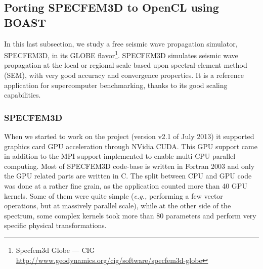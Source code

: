 \documentclass{IEEEtran}
\newcommand{\latin}[1]{\textit{#1}}
\newcommand{\eg}{\latin{e.g.,}\xspace}
\begin{document}
% 
% 
% 
% 
 


  \subsection{Porting SPECFEM3D to OpenCL using BOAST}
  \label{subsec:specfem}

In this last subsection, we study a free seismic wave propagation simulator,
SPECFEM3D, in its GLOBE flavor\footnote{Specfem3d Globe --- CIG
\url{http://www.geodynamics.org/cig/software/specfem3d-globe}}. SPECFEM3D
simulates seismic wave propagation at the local or regional scale based upon
spectral-element method (SEM), with very good accuracy and convergence
properties. It is a reference application for supercomputer benchmarking,
thanks to its good scaling capabilities.

    \subsubsection{SPECFEM3D}

When we started to work on the project (version v2.1 of July 2013) it
supported graphics card GPU acceleration through NVidia CUDA. This
GPU support came in addition to the MPI support implemented to enable
multi-CPU parallel computing. Most of SPECFEM3D code-base is written in
Fortran 2003 and only the GPU related parts are written in
C.  The split between CPU and GPU code was done at a rather fine
grain, as the application counted more than 40 GPU kernels. Some of
them were quite simple (\eg performing a few vector operations, but at
massively parallel scale), while at the other side of the spectrum,
some complex kernels took more than 80 parameters and perform very
specific physical transformations.
\end{document}
